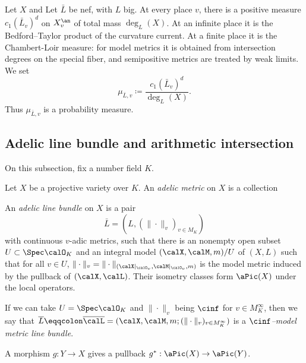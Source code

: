 \begin{definition}[label=\labelNFM{def:Chambert-Loir-measure}, status=draft, tag=0000000]
	Let $X$ and
	Let $\bar L$ be nef, with $L$ big.
	At every place $v$, there is a positive measure $c_1(\bar L_v)^d$ on $X_v^\an$ of total mass $\deg_L(X)$.
	At an infinite place it is the Bedford--Taylor product of the curvature current.
	At a finite place it is the Chambert-Loir measure: for model metrics it is obtained from intersection degrees on the special fiber, and semipositive metrics are treated by weak limits.
	We set
	\[ \mu_{\bar L,v} \coloneqq \frac{c_1(\bar L_v)^d}{\deg_L(X)}. \]
	Thus $\mu_{\bar L,v}$ is a probability measure.
	\Yang{}
\end{definition}




























\subsection[status=draft,tag=0000000,label=\labelNFM{subsec:adelic-line-bundle-and-positivity}]{Adelic line bundle and arithmetic intersection}

On this subsection, fix a number field $K$.

\begin{definition}[label=\labelNFM{def:adelic-line-bundle-projective-case}, status=draft, tag=0000000]
	Let $X$ be a projective variety over $K$.
	An \emph{adelic metric} on $X$ is a collection

	An \emph{adelic line bundle} on $X$ is a pair
	\[ \bar L = (L,(\|\cdot\|_v)_{v \in M_K}) \]
	with continuous $v$-adic metrics, such that there is an nonempty open subset $U \subset \Spec \calO_K$ and an integral model $(\calX,\calM,m)/U$ of $(X,L)$ such that for all $v \in U$, $\|\cdot\|_v = \|\cdot\|_{(\calX|_{\calO_v},\calM|_{\calO_v},m)}$ is the model metric induced by the pullback of $(\calX,\calL)$.
	Their isometry classes form $\aPic(X)$ under the local operators.

	If we can take $U = \Spec \calO_K$ and $\|\cdot\|_v$ being $\cinf$ for $v \in M_K^\infty$, then we say that $\overline{L} \eqqcolon \overline{\calL} = (\calX,\calM,m; (\|\cdot\|_v)_{v \in M_K^\infty})$ is a \emph{$\cinf$--model metric line bundle}.
\end{definition}
A morphism $g:Y \to X$ gives a pullback $g^*:\aPic(X) \to \aPic(Y)$.

